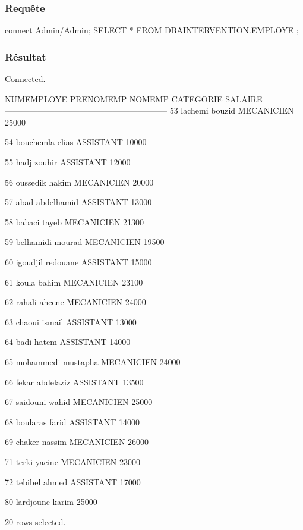 \documentclass[•]{article}
\begin{document}
\subsubsection{Requête}
\begin{sql}
connect Admin/Admin;
SELECT * FROM DBAINTERVENTION.EMPLOYE ;
\end{sql}
\subsubsection{Résultat}
\begin{sql}
Connected.

NUMEMPLOYE  PRENOMEMP        NOMEMP    CATEGORIE    SALAIRE
-----------------------------------------------------------
        53    lachemi        bouzid   MECANICIEN      25000

        54  bouchemla         elias    ASSISTANT      10000

        55       hadj        zouhir    ASSISTANT      12000

        56   oussedik         hakim   MECANICIEN      20000

        57       abad    abdelhamid    ASSISTANT      13000

        58     babaci         tayeb   MECANICIEN      21300

        59  belhamidi        mourad   MECANICIEN      19500

        60   igoudjil      redouane    ASSISTANT      15000

        61      koula         bahim   MECANICIEN      23100

        62     rahali        ahcene   MECANICIEN      24000

        63     chaoui        ismail    ASSISTANT      13000

        64       badi         hatem    ASSISTANT      14000

        65  mohammedi      mustapha   MECANICIEN      24000

        66      fekar     abdelaziz    ASSISTANT      13500

        67   saidouni         wahid   MECANICIEN      25000

        68   boularas         farid    ASSISTANT      14000

        69     chaker        nassim   MECANICIEN      26000

        71      terki        yacine   MECANICIEN      23000

        72    tebibel         ahmed    ASSISTANT      17000

        80  lardjoune         karim                   25000


20 rows selected.
\end{sql}
\end{document}
